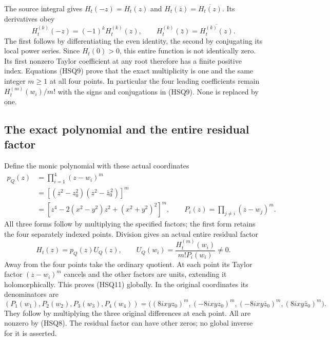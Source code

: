 The source integral gives $H_t(-z)=H_t(z)$ and
$H_t(\bar z)=\overline{H_t(z)}$. Its derivatives obey
\begin{equation}\tag{HSQ9}
 H_t^{(k)}(-z)=(-1)^kH_t^{(k)}(z),\qquad
 H_t^{(k)}(\bar z)=\overline{H_t^{(k)}(z)}.
\end{equation}
The first follows by differentiating the even identity, the second
by conjugating its local power series. Since $H_t(0)>0$, this
entire function is not identically zero. Its first nonzero Taylor
coefficient at any root therefore has a finite positive index.
Equations (HSQ9) prove that the exact multiplicity is one and the
same integer $m\ge1$ at all four points. In particular the four
leading coefficients remain
$H_t^{(m)}(w_i)/m!$ with the signs and conjugations in (HSQ9).
None is replaced by one.

\subsection{The exact polynomial and the entire residual factor}

Define the monic polynomial with these actual coordinates
\begin{equation}\tag{HSQ10}
 \begin{split}
 p_Q(z)&=\prod_{i=1}^4(z-w_i)^m\\
 &=\left[(z^2-z_0^2)(z^2-\bar z_0^{\,2})\right]^m\\
 &=\left[z^4-2(x^2-y^2)z^2+(x^2+y^2)^2\right]^m,
 \qquad P_i(z)=\prod_{j\ne i}(z-w_j)^m.
 \end{split}
\end{equation}
All three forms follow by multiplying the specified factors; the
first form retains the four separately indexed points. Division
gives an actual entire residual factor
\begin{equation}\tag{HSQ11}
 H_t(z)=p_Q(z)U_Q(z),\qquad
 U_Q(w_i)=\frac{H_t^{(m)}(w_i)}{m!P_i(w_i)}\ne0.
\end{equation}
Away from the four points take the ordinary quotient. At each
point its Taylor factor $(z-w_i)^m$ cancels and the other factors
are units, extending it holomorphically. This proves (HSQ11)
globally. In the original coordinates its denominators are
\begin{equation}\tag{HSQ12}
 (P_1(w_1),P_2(w_2),P_3(w_3),P_4(w_4))
 =\bigl((8ixyz_0)^m,(-8ixyz_0)^m,
        (-8ixy\bar z_0)^m,(8ixy\bar z_0)^m\bigr).
\end{equation}
They follow by multiplying the three original differences at
each point. All are nonzero by (HSQ8). The residual factor can
have other zeros; no global inverse for it is asserted.

